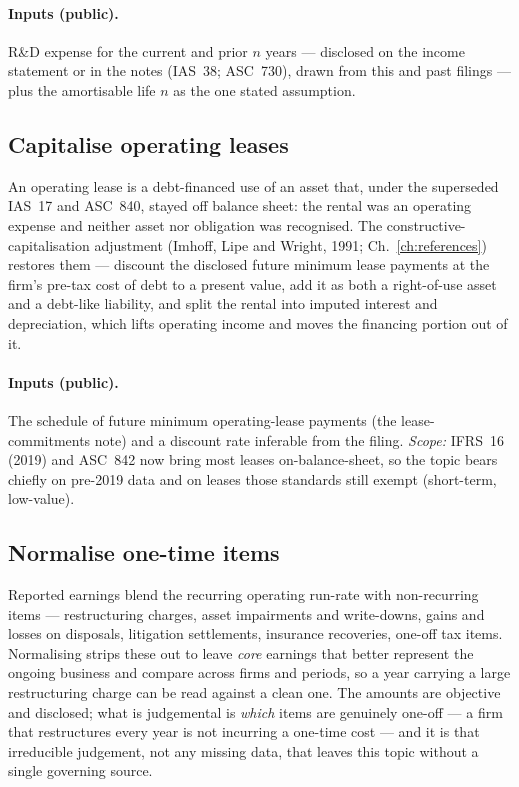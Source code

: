 \documentclass[11pt,a4paper]{report}
\begin{document}
\paragraph{Inputs (public).} R\&D expense for the current and prior $n$ years --- disclosed on the income
statement or in the notes (IAS~38; ASC~730), drawn from this and past filings --- plus the amortisable life $n$
as the one stated assumption.

\subsection{Capitalise operating leases}
\label{sec:topics-leases}
An operating lease is a debt-financed use of an asset that, under the superseded IAS~17 and ASC~840, stayed off
balance sheet: the rental was an operating expense and neither asset nor obligation was recognised. The
constructive-capitalisation adjustment (Imhoff, Lipe and Wright, 1991; Ch.~\ref{ch:references}) restores them
--- discount the disclosed future minimum lease payments at the firm's pre-tax cost of debt to a present value,
add it as both a right-of-use asset and a debt-like liability, and split the rental into imputed interest and
depreciation, which lifts operating income and moves the financing portion out of it.

\paragraph{Inputs (public).} The schedule of future minimum operating-lease payments (the lease-commitments
note) and a discount rate inferable from the filing. \emph{Scope:} IFRS~16 (2019) and ASC~842 now bring most
leases on-balance-sheet, so the topic bears chiefly on pre-2019 data and on leases those standards still exempt
(short-term, low-value).

\subsection{Normalise one-time items}
\label{sec:topics-normalise}
Reported earnings blend the recurring operating run-rate with non-recurring items --- restructuring charges,
asset impairments and write-downs, gains and losses on disposals, litigation settlements, insurance
recoveries, one-off tax items. Normalising strips these out to leave \emph{core} earnings that better represent
the ongoing business and compare across firms and periods, so a year carrying a large restructuring charge can
be read against a clean one. The amounts are objective and disclosed; what is judgemental is \emph{which} items
are genuinely one-off --- a firm that restructures every year is not incurring a one-time cost --- and it is
that irreducible judgement, not any missing data, that leaves this topic without a single governing source.
\end{document}
